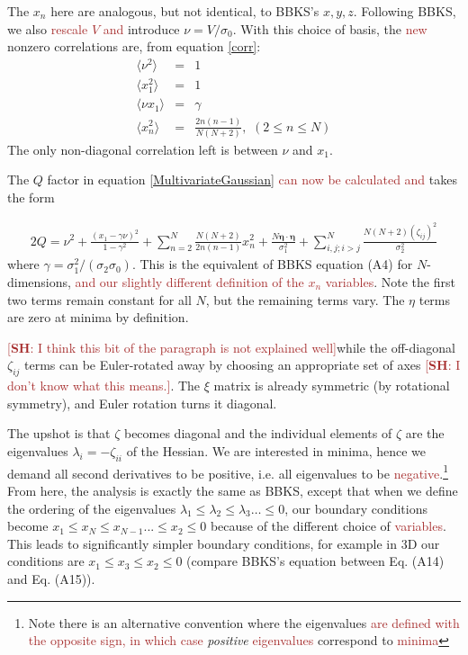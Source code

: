 \documentclass[12pt]{article}
\newcommand{\SH}[1]{\textcolor{brown}{[{\bf SH}: #1]}}
\newcommand{\sh}[1]{\textcolor{brown}{#1}}
\begin{document}

The $x_n$ here are analogous, but not identical, to BBKS's $x, y, z$. Following BBKS, we also \sh{rescale $V$ and} introduce $\nu = V/\sigma_0$. With this choice of basis, the \sh{new} nonzero correlations are, from equation \eqref{corr}:
%
\begin{eqnarray}
  \langle\nu^2\rangle &=& 1 \nonumber\\
  \langle x_1^2\rangle&=&1 \\
  \langle\nu x_1\rangle &=& \gamma \nonumber\\
  \langle x_n^2 \rangle &=& \frac{2n(n-1)}{N(N+2)},\,\, (2\leq n \leq N) \nonumber
\end{eqnarray}
%
The only non-diagonal correlation left is between $\nu$ and $x_1$.

The $Q$ factor in equation \eqref{MultivariateGaussian} \sh{can now be calculated and} takes the form

\begin{equation} \label{Q}
\begin{split}
2Q = \nu^2 + \frac{(x_1-\gamma \nu)^2}{1-\gamma^2}+\sum_{n=2}^N\frac{N(N+2)}{2n(n-1)}x_n^2 + \frac{N \pmb{\eta}\cdot \pmb{\eta}}{\sigma_1^2} + \sum_{i,j;i > j}^N\frac{N(N+2)(\zeta_{ij})^2}{\sigma_2^2}
\end{split}
\end{equation}
%
where $\gamma = \sigma_1^2/(\sigma_2 \sigma_0)$. This is the equivalent of BBKS equation (A4) for $N$-dimensions, \sh{and our slightly different definition of the $x_n$ variables}. Note the first two terms remain constant for all $N$, but the remaining terms vary. The $\eta$ terms are zero at minima by definition.

\SH{I think this bit of the paragraph is not explained well}while the off-diagonal $\zeta_{ij}$ terms can be Euler-rotated away by choosing an appropriate set of axes \SH{I don't know what this means.}. The $\xi$ matrix is already symmetric (by rotational symmetry), and Euler rotation turns it diagonal.\cite{Goldstein}

The upshot is that $\zeta$ becomes diagonal and the individual elements of $\zeta$ are the eigenvalues $\lambda_i = -\zeta_{ii}$ of the Hessian. We are interested in minima, hence we demand all second derivatives to be positive, i.e. all eigenvalues to be \sh{negative}.\footnote{Note there is an alternative convention where the eigenvalues \sh{are defined with the opposite sign, in which case} \emph{positive} \sh{eigenvalues} correspond to \sh{minima}} From here, the analysis is exactly the same as BBKS, except that when we define the ordering of the eigenvalues $\lambda_1 \leq \lambda_2 \leq \lambda_3 \ldots \leq 0$, our boundary conditions become $x_1\leq x_N\leq x_{N-1} ... \leq x_2 \leq 0$ because of the different choice of \sh{variables}. This leads to significantly simpler boundary conditions, for example in 3D our conditions are $x_1\leq x_3 \leq x_2 \leq 0$ (compare BBKS's equation between Eq. (A14) and Eq. (A15)).
\end{document}
